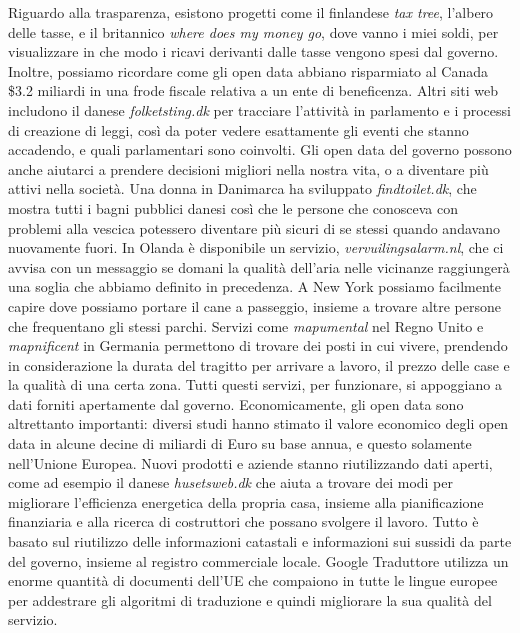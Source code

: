 Riguardo alla trasparenza, esistono progetti come il finlandese \textit{tax tree}, l'albero delle tasse, e il britannico \textit{where does my money go}, dove vanno i miei soldi, per visualizzare in che modo i ricavi derivanti dalle tasse vengono spesi dal governo. Inoltre, possiamo ricordare come gli open data abbiano risparmiato al Canada \$3.2 miliardi in una frode fiscale relativa a un ente di beneficenza. Altri siti web includono il danese \textit{folketsting.dk} per tracciare l'attività in parlamento e i processi di creazione di leggi, così da poter vedere esattamente gli eventi che stanno accadendo, e quali parlamentari sono coinvolti.
Gli open data del governo possono anche aiutarci a prendere decisioni migliori nella nostra vita, o a diventare più attivi nella società. Una donna in Danimarca ha sviluppato \textit{findtoilet.dk}, che mostra tutti i bagni pubblici danesi così che le persone che conosceva con problemi alla vescica potessero diventare più sicuri di se stessi quando andavano nuovamente fuori. In Olanda è disponibile un servizio, \textit{vervuilingsalarm.nl}, che ci avvisa con un messaggio se domani la qualità dell'aria nelle vicinanze raggiungerà una soglia che abbiamo definito in precedenza. A New York possiamo facilmente capire dove possiamo portare il cane a passeggio, insieme a trovare altre persone che frequentano gli stessi parchi. Servizi come \textit{mapumental} nel Regno Unito e \textit{mapnificent} in Germania permettono di trovare dei posti in cui vivere, prendendo in considerazione la durata del tragitto per arrivare a lavoro, il prezzo delle case e la qualità di una certa zona. Tutti questi servizi, per funzionare, si appoggiano a dati forniti apertamente dal governo.
Economicamente, gli open data sono altrettanto importanti: diversi studi hanno stimato il valore economico degli open data in alcune decine di miliardi di Euro su base annua, e questo solamente nell'Unione Europea. Nuovi prodotti e aziende stanno riutilizzando dati aperti, come ad esempio il danese \textit{husetsweb.dk} che aiuta a trovare dei modi per migliorare l'efficienza energetica della propria casa, insieme alla pianificazione finanziaria e alla ricerca di costruttori che possano svolgere il lavoro. Tutto è basato sul riutilizzo delle informazioni catastali e informazioni sui sussidi da parte del governo, insieme al registro commerciale locale. Google Traduttore utilizza un enorme quantità di documenti dell'UE che compaiono in tutte le lingue europee per addestrare gli algoritmi di traduzione e quindi migliorare la sua qualità del servizio.

